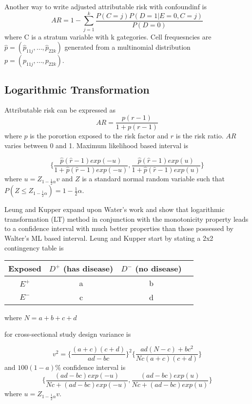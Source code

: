 Another way to write adjusted attributable risk with confoundinf is
\begin{equation}
    AR = 1 - \sum_{j=1}^{k}\frac{P(C=j)P(D=1|E=0,C=j)}{P(D=0)}
\end{equation} where C is a stratum variable with k gategories. Cell frequesncies are $\hat{p} = (\hat{p}_{11j}, ..., \hat{p}_{22k})$ generated from a multinomial distribution $p = (p_{11j}, ..., p_{22k})$. \cite{LehnertBatar2006ComparisonOC}

\subsection{Logarithmic Transformation}
Attributable risk can be expressed as
\begin{equation}
    AR = \frac{p(r-1)}{1 + p(r-1)}
\end{equation} where $p$ is the porortion exposed to the risk factor and $r$ is the risk ratio. $AR$ varies between 0 and 1. Maximum likelihood based interval is

\begin{equation}
    \{\frac{\hat{p}(\hat{r}-1) exp (- u)}{1+\hat{p}(\hat{r}-1) exp (- u)}, \frac{\hat{p}(\hat{r}-1) exp (u)}{1+\hat{p}(\hat{r}-1) exp (u)}\}
\end{equation}where $u = Z_{1-\frac{1}{2}\alpha}v$ and $Z$ is a standard normal random variable such that $P(Z \leq Z_{1-\frac{1}{2}\alpha}) = 1 - \frac{1}{2}\alpha$. 

Leung and Kupper expand upon Water's work and show that logarithmic transformation (LT) method in conjunction with the monotonicity property leads to a confidence interval with much better properties than those possessed by Walter's ML based interval. Leung and Kupper start by stating a 2x2 contingency table is
\begin{table}[ht]
    \centering
    \begin{tabular}{|c|c|c|c|}
    \hline
    Exposed & $D^+$ (has disease) & $D^-$ (no disease) \\ \hline
    $E^+$ & a & b  \\ \hline
    $E^-$ & c & d\\ \hline
\end{tabular}
\end{table} where $N = a + b + c + d$

for cross-sectional study design variance is

\begin{equation}
    v^2 = \{\frac{(a+c)(c+d)}{ad -bc}\}^2\{\frac{ad(N-c)+bc^2}{Nc(a+c)(c+d)}\}
\end{equation} and $100(1-a)\%$ confidence interval is 
\begin{equation}
    \{\frac{(ad-bc)exp(-u)}{Nc+(ad-bc)exp(-u)}, \frac{(ad-bc)exp(u)}{Nc+(ad-bc)exp(u)}\}
\end{equation} where $u = Z_{1-\frac{1}{2}\alpha}v$.

